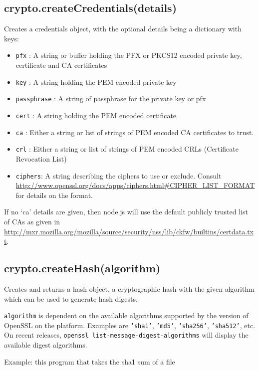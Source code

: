 \subsection{crypto.createCredentials(details)}

Creates a credentials object, with the optional details being a
dictionary with keys:

\begin{itemize}
\item
  \texttt{pfx} : A string or buffer holding the PFX or PKCS12 encoded
  private key, certificate and CA certificates
\item
  \texttt{key} : A string holding the PEM encoded private key
\item
  \texttt{passphrase} : A string of passphrase for the private key or
  pfx
\item
  \texttt{cert} : A string holding the PEM encoded certificate
\item
  \texttt{ca} : Either a string or list of strings of PEM encoded CA
  certificates to trust.
\item
  \texttt{crl} : Either a string or list of strings of PEM encoded CRLs
  (Certificate Revocation List)
\item
  \texttt{ciphers}: A string describing the ciphers to use or exclude.
  Consult
  \url{http://www.openssl.org/docs/apps/ciphers.html#CIPHER_LIST_FORMAT}
  for details on the format.
\end{itemize}

If no `ca' details are given, then node.js will use the default publicly
trusted list of CAs as given in
\url{http://mxr.mozilla.org/mozilla/source/security/nss/lib/ckfw/builtins/certdata.txt}.

\subsection{crypto.createHash(algorithm)}

Creates and returns a hash object, a cryptographic hash with the given
algorithm which can be used to generate hash digests.

\texttt{algorithm} is dependent on the available algorithms supported by
the version of OpenSSL on the platform. Examples are \texttt{'sha1'},
\texttt{'md5'}, \texttt{'sha256'}, \texttt{'sha512'}, etc. On recent
releases, \texttt{openssl list-message-digest-algorithms} will display
the available digest algorithms.

Example: this program that takes the sha1 sum of a file

